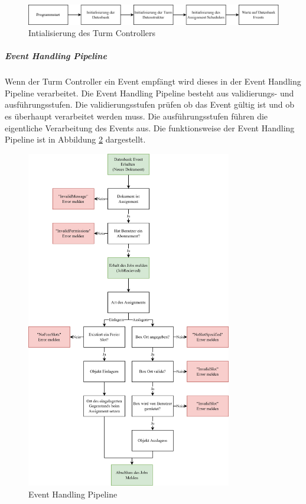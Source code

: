 \begin{figure}[ht]
  \centering
  \includegraphics[width=1\textwidth]{images/tower_controller_v4_init.png}
  \caption{Intialisierung des Turm Controllers}
  \label{fig:tower_controller_v4_init}
\end{figure}

\subparagraph{Event Handling Pipeline}

Wenn der Turm Controller ein Event empfängt wird dieses in der Event Handling Pipeline verarbeitet. Die Event Handling Pipeline besteht aus validierungs- und ausführungsstufen. Die validierungsstufen prüfen ob das Event gültig ist und ob es überhaupt verarbeitet werden muss. Die ausführungsstufen führen die eigentliche Verarbeitung des Events aus. Die funktionsweise der Event Handling Pipeline ist in Abbildung \ref{fig:tower_controller_v4_event_handling} dargestellt.

\begin{figure}[!ht]
  \centering
  \includegraphics[width=0.8\textwidth]{images/tower_controller_v4_event_handling.png}
  \caption{Event Handling Pipeline}
  \label{fig:tower_controller_v4_event_handling}
\end{figure}


